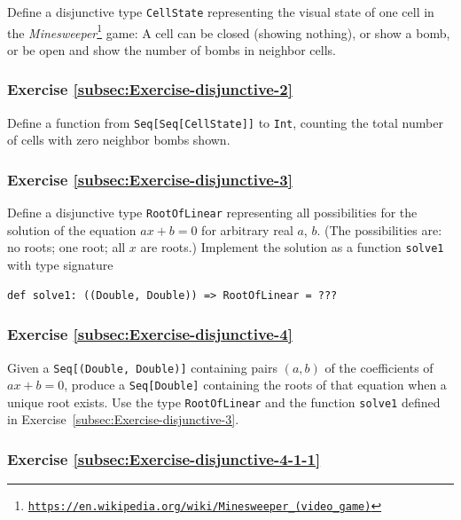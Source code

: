 Define a disjunctive type \lstinline!CellState! representing the
visual state of one cell in the \emph{Minesweeper}\footnote{\texttt{\href{https://en.wikipedia.org/wiki/Minesweeper_(video_game)}{https://en.wikipedia.org/wiki/Minesweeper\_(video\_game)}}}
game: A cell can be closed (showing nothing), or show a bomb, or be
open and show the number of bombs in neighbor cells.

\subsubsection{Exercise \label{subsec:Exercise-disjunctive-2}\ref{subsec:Exercise-disjunctive-2}}

Define a function from \lstinline!Seq[Seq[CellState]]! to \lstinline!Int!,
counting the total number of cells with zero neighbor bombs shown.

\subsubsection{Exercise \label{subsec:Exercise-disjunctive-3}\ref{subsec:Exercise-disjunctive-3}}

Define a disjunctive type \lstinline!RootOfLinear! representing all
possibilities for the solution of the equation $ax+b=0$ for arbitrary
real $a$, $b$. (The possibilities are: no roots; one root; all $x$
are roots.) Implement the solution as a function \lstinline!solve1!
with type signature 
\begin{lstlisting}
def solve1: ((Double, Double)) => RootOfLinear = ???
\end{lstlisting}


\subsubsection{Exercise \label{subsec:Exercise-disjunctive-4}\ref{subsec:Exercise-disjunctive-4}}

Given a \lstinline!Seq[(Double, Double)]! containing pairs $\left(a,b\right)$
of the coefficients of $ax+b=0$, produce a \lstinline!Seq[Double]!
containing the roots of that equation when a unique root exists. Use
the type \lstinline!RootOfLinear! and the function \lstinline!solve1!
defined in Exercise~\ref{subsec:Exercise-disjunctive-3}.

\subsubsection{Exercise \label{subsec:Exercise-disjunctive-4-1-1}\ref{subsec:Exercise-disjunctive-4-1-1}}

